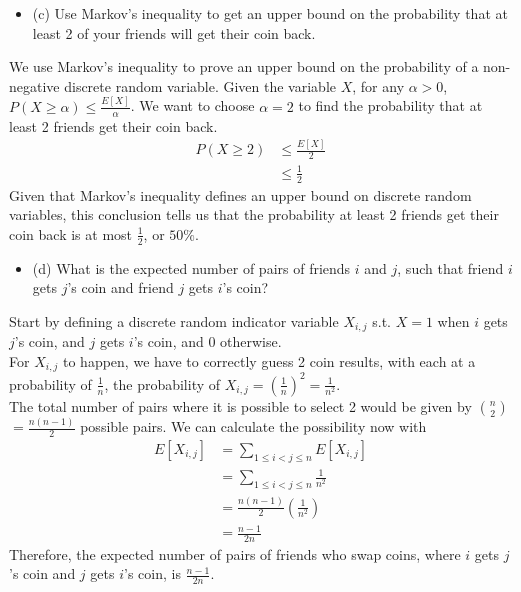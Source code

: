 \documentclass{article}
\begin{document}
\begin{enumerate}
\begin{itemize}
    \item (c) Use Markov's inequality to get an upper bound on the probability that at least 2 of your friends will get their coin back.
\end{itemize}
We use Markov's inequality to prove an upper bound on the probability of a non-negative discrete random variable. Given the variable $X$, for any $\alpha > 0$, $P(X \geq \alpha) \leq \frac{E[X]}{\alpha}$. We want to choose $\alpha = 2$ to find the probability that at least 2 friends get their coin back.
\begin{align*}
    P(X \geq 2) & \leq \frac{E[X]}{2} \\
    & \leq \frac{1}{2}
\end{align*}
Given that Markov's inequality defines an upper bound on discrete random variables, this conclusion tells us that the probability at least 2 friends get their coin back is at most $\frac{1}{2}$, or $50\%$.







\newpage
\begin{itemize}
    \item (d) What is the expected number of pairs of friends $i$ and $j$, such that friend $i$ gets $j$'s coin and friend $j$ gets $i$'s coin?
\end{itemize}
Start by defining a discrete random indicator variable $X_{i,j}$ s.t. $X = 1$ when $i$ gets $j$'s coin, and $j$ gets $i$'s coin, and 0 otherwise. \\
For $X_{i,j}$ to happen, we have to correctly guess 2 coin results, with each at a probability of $\frac{1}{n}$, the probability of $X_{i,j} = (\frac{1}{n})^2 = \frac{1}{n^2}$. \\
The total number of pairs where it is possible to select 2 would be given by $n \choose 2$ $= \frac{n(n-1)}{2}$ possible pairs. We can calculate the possibility now with
\begin{align*}
    E[X_{i,j}] & = \sum_{1 \leq i < j \leq n} E[X_{i,j}] \\
    & = \sum_{1 \leq i < j \leq n} \frac{1}{n^2} \\
    & = \frac{n(n-1)}{2} (\frac{1}{n^2}) \\
    & = \frac{n-1}{2n}
\end{align*}
Therefore, the expected number of pairs of friends who swap coins, where $i$ gets $j$'s coin and $j$ gets $i$'s coin, is $\frac{n-1}{2n}$. \\
\newline 







\end{enumerate}
\end{document}
